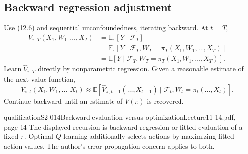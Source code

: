 \subsection{Backward regression adjustment}
Use (12.6) and sequential unconfoundedness, iterating backward. At $t=T$,
\begin{align*}
 V_{\pi,T}(X_1,W_1,\ldots,X_T)
 &=\mathbb E_\pi[Y\mid\mathcal F_T]\\
 &=\mathbb E_\pi[Y\mid\mathcal F_T,W_T=\pi_T(X_1,W_1,\ldots,X_T)]\\
 &=\mathbb E[Y\mid\mathcal F_T,W_T=\pi_T(X_1,W_1,\ldots,X_T)].
\end{align*}
Learn $\widehat V_{\pi,T}$ directly by nonparametric regression. Given a reasonable estimate of the next value function,
\[
 V_{\pi,t}(X_1,W_1,\ldots,X_t)
 \approx\mathbb E[\widehat V_{\pi,t+1}(\ldots,X_{t+1})
 \mid\mathcal F_t,W_t=\pi_t(\ldots,X_t)].\tag{12.12}
\]
Continue backward until an estimate of $V(\pi)$ is recovered.

\begin{reviewnote}{qualification}{S2-014}{Backward evaluation versus optimization}{Lecture11-14.pdf, page 14}
The displayed recursion is backward regression or fitted evaluation of a fixed $\pi$. Optimal $Q$-learning additionally selects actions by maximizing fitted action values. The author's error-propagation concern applies to both.
\end{reviewnote}


